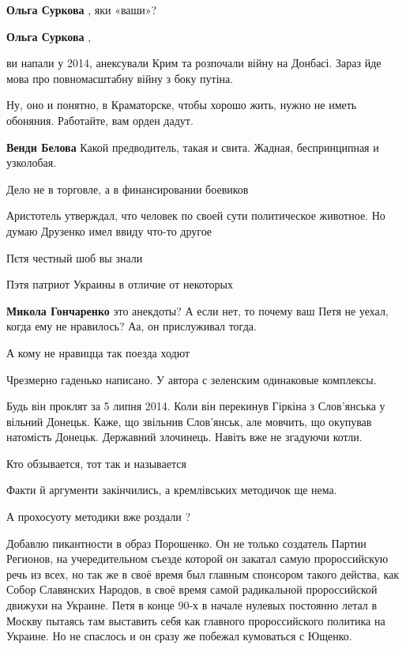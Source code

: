 \begin{itemize}
\begin{itemize}
\textbf{Ольга Суркова} , яки «ваши»?

\textbf{Ольга Суркова} , 

ви напали у 2014, анексували Крим та розпочали війну на Донбасі. Зараз йде мова
про повномасштабну війну з боку путіна.

\end{itemize} %

Ну, оно и понятно, в Краматорске, чтобы хорошо жить, нужно не иметь обоняния. Работайте, вам орден дадут.

\textbf{Венди Белова} Какой предводитель, такая и свита. Жадная, беспринципная и узколобая.

Дело не в торговле, а в финансировании боевиков

Аристотель утверждал, что человек по своей сути политическое животное. Но думаю Друзенко имел ввиду что-то другое

Пєтя честный шоб вы знали

Пэтя патриот Украины в отличие от некоторых

\textbf{Микола Гончаренко} это анекдоты? А если нет, то почему ваш Петя не уехал, когда ему не нравилось? Аа, он прислуживал тогда.

А кому не нравицца так поезда ходют

Чрезмерно гаденько написано. У автора с зеленским одинаковые комплексы.


Будь він проклят за 5 липня 2014. Коли він перекинув Гіркіна з Слов'янська у
вільний Донецьк. Каже, що звільнив Слов'янськ, але мовчить, що окупував
натомість Донецьк. Державний злочинець. Навіть вже не згадуючи котли.

Кто обзывается, тот так и называется

Факти й аргументи закінчились, а кремлівських методичок ще нема.

А прохосуоту методики вже роздали ?


Добавлю пикантности в образ Порошенко. Он не только создатель Партии Регионов,
на учередительном съезде которой он закатал самую пророссийскую речь из всех,
но так же в своё время был главным спонсором такого действа, как Собор
Славянских Народов, в своё время самой радикальной пророссийской движухи на
Украине. Петя в конце 90-х в начале нулевых постоянно летал в Москву пытаясь
там выставить себя как главного пророссийского политика на Украине. Но не
спаслось и он сразу же побежал кумоваться с Ющенко.


\end{itemize}
